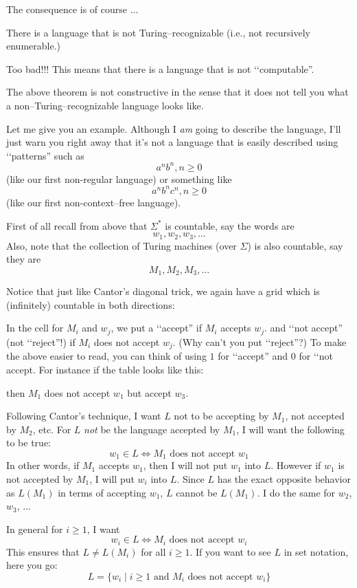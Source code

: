 The consequence is of course ...

\begin{thm}
There is a language that is not Turing--recognizable
(i.e., not recursively enumerable.)
\end{thm}

Too bad!!!
This means that there is a language that is not \lq\lq computable''.

The above theorem is not constructive in the sense that
it does not tell you what a non--Turing--recognizable language looks like.

Let me give you an example.
Although I \textit{am} going to describe the language,
I'll just warn you right away that it's not a language that is easily
described using \lq\lq patterns''
such as 
\[
a^n b^n, n \geq 0
\]
(like our first non-regular language) or something like
\[
a^n b^n c^n, n \geq 0
\]
(like our first non-context--free language).

First of all recall from above that $\Sigma^*$ is countable,
say the words are
\[
w_1, w_2, w_3, \ldots
\]
Also, note that the collection of Turing machines (over $\Sigma$) is also 
countable, say they are
\[
M_1, M_2, M_3, \ldots
\]

Notice that just like Cantor's diagonal trick, we again have
a grid which is (infinitely) countable in both directions:


In the cell for $M_i$ and $w_j$, we put a \lq\lq accept'' 
if $M_i$ accepts $w_j$.
and \lq\lq not accept'' (not \lq\lq reject''!) if $M_i$ 
does not accept $w_j$.
(Why can't you put \lq\lq reject''?)
To make the above easier to read, you can think of using 
$1$ for \lq\lq accept'' and $0$ for \lq\lq not accept.
For instance if the table looks like this:


then $M_1$ does not accept $w_1$ but accept $w_3$.

Following Cantor's technique,
I want $L$ not to be accepting by $M_1$,
not accepted by $M_2$, etc.
For $L$ \textit{not} be the language
accepted by $M_1$, I will want the following to be true:
\[
w_1 \in L \iff M_1 \text{ does not accept }  w_1
\]
In other words, if $M_1$ accepts $w_1$, then I will not put $w_1$ into $L$.
However if $w_1$ is not accepted by $M_1$, I will put $w_i$ into $L$.
Since $L$ has the exact 
opposite behavior as $L(M_1)$ in terms of accepting $w_1$,
$L$ cannot be $L(M_1)$.
I do the same for $w_2$, $w_3$, ...

In general for $i \geq 1$, I want
\[
w_i \in L \iff M_i \text{ does not accept }  w_i
\]
This ensures that $L \neq L(M_i)$ for all $i \geq 1$.
If you want to see $L$ in set notation, here you go:
\[
L = \{ w_i \mid i \geq 1 \text{ and } M_i \text{ does not accept } w_i \}
\]

